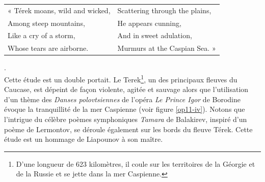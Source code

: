 \begin{tabular}{ll}
\hspace{-3.9mm}« Térek moans, wild and wicked,
&
Scattering through the plains,
\\
Among steep mountains,
&
He appears cunning,
\\
Like a cry of a storm,
&
And in sweet adulation,
\\
Whose tears are airborne.
&
Murmurs at the Caspian Sea. »
\end{tabular}.\\

Cette étude est un double portait. Le Terek\footnote{D'une longueur de 623 kilomètres, il coule sur les territoires de la Géorgie et de la Russie et se jette dans la mer Caspienne.}, un des principaux fleuves du Caucase, est dépeint de façon violente, agitée et sauvage alors que l'utilisation d'un thème des \emph{Danses polovtsiennes} de l'opéra \emph{Le Prince Igor} de Borodine évoque la tranquillité de la mer Caspienne  (voir figure \ref{op11-iv}). Notons que l'intrigue du célèbre poèmes symphoniques \emph{Tamara} de Balakirev, inspiré d'un poème de Lermontov, se déroule également sur les bords du fleuve Térek. Cette étude est un hommage de Liapounov à son maître.


